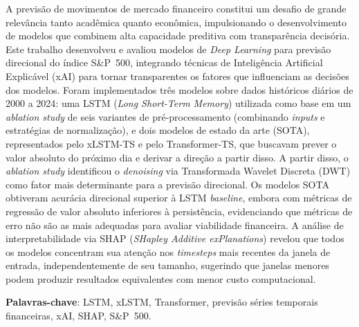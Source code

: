 \begin{resumo}

    A previsão de movimentos de mercado financeiro constitui um desafio de grande relevância tanto acadêmica quanto econômica, impulsionando o desenvolvimento de modelos que combinem alta capacidade preditiva com transparência decisória. Este trabalho desenvolveu e avaliou modelos de \textit{Deep Learning} para previsão direcional do índice S\&P~500, integrando técnicas de Inteligência Artificial Explicável (xAI) para tornar transparentes os fatores que influenciam as decisões dos modelos. Foram implementados três modelos sobre dados históricos diários de 2000 a 2024: uma LSTM (\textit{Long Short-Term Memory}) utilizada como base em um \textit{ablation study} de seis variantes de pré-processamento (combinando \textit{inputs} e estratégias de normalização), e dois modelos de estado da arte (SOTA), representados pelo xLSTM-TS e pelo Transformer-TS, que buscavam prever o valor absoluto do próximo dia e derivar a direção a partir disso. A partir disso, o \textit{ablation study} identificou o \textit{denoising} via Transformada Wavelet Discreta (DWT) como fator mais determinante para a previsão direcional. Os modelos SOTA obtiveram acurácia direcional superior à LSTM \textit{baseline}, embora com métricas de regressão de valor absoluto inferiores à persistência, evidenciando que métricas de erro não são as mais adequadas para avaliar viabilidade financeira. A análise de interpretabilidade via SHAP (\textit{SHapley Additive exPlanations}) revelou que todos os modelos concentram sua atenção nos \textit{timesteps} mais recentes da janela de entrada, independentemente de seu tamanho, sugerindo que janelas menores podem produzir resultados equivalentes com menor custo computacional.

 \vspace{\onelineskip}
    
 \noindent
 \textbf{Palavras-chave}: LSTM, xLSTM, Transformer, previsão séries temporais financeiras, xAI, SHAP, S\&P~500.
\end{resumo}
